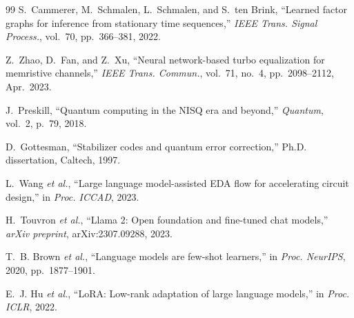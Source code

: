 \begin{thebibliography}{99}
S.~Cammerer, M.~Schmalen, L.~Schmalen, and S.~ten Brink,
``Learned factor graphs for inference from stationary time sequences,''
\textit{IEEE Trans. Signal Process.}, vol.~70, pp.~366--381, 2022.

Z.~Zhao, D.~Fan, and Z.~Xu,
``Neural network-based turbo equalization for memristive channels,''
\textit{IEEE Trans. Commun.}, vol.~71, no.~4, pp.~2098--2112, Apr.~2023.

J.~Preskill,
``Quantum computing in the NISQ era and beyond,''
\textit{Quantum}, vol.~2, p.~79, 2018.

D.~Gottesman,
``Stabilizer codes and quantum error correction,''
Ph.D. dissertation, Caltech, 1997.

L.~Wang \textit{et al.},
``Large language model-assisted EDA flow for accelerating circuit design,''
in \textit{Proc. ICCAD}, 2023.

H.~Touvron \textit{et al.},
``Llama 2: Open foundation and fine-tuned chat models,''
\textit{arXiv preprint}, arXiv:2307.09288, 2023.

T.~B. Brown \textit{et al.},
``Language models are few-shot learners,''
in \textit{Proc. NeurIPS}, 2020, pp.~1877--1901.

E.~J. Hu \textit{et al.},
``LoRA: Low-rank adaptation of large language models,''
in \textit{Proc. ICLR}, 2022.

\end{thebibliography}